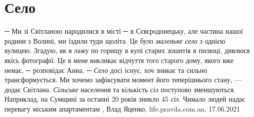  
 
 
 
 
\chapter{Село}

─ Ми зі Світланою народилися в місті ─ в Сєвєродонецьку, але частина нашої
родини з Волині, ми їздили туди щоліта. Це було \emph{маленьке село} з однією вулицею.
Згадую, як я лажу по горищу в купі старих зошитів в пилюці, дивлюся якісь
фотографії. Це в мене викликає відчуття того старого дому, якого вже немає, ─
розповідає Анна.  ─ \emph{Село} досі існує, хоч зникає та сильно трансформується. Ми
хочемо зафіксувати момент його теперішнього стану, — додає Світлана.  \emph{Сільське}
населення та кількість \emph{сіл} поступово зменшуються. Наприклад, на Сумщині за
останні 20 років зникло 45 \emph{сіл}. Чимало людей надає перевагу міським
апартаментам
, 
Влад Яценко, life.pravda.com.ua, 17.06.2021
